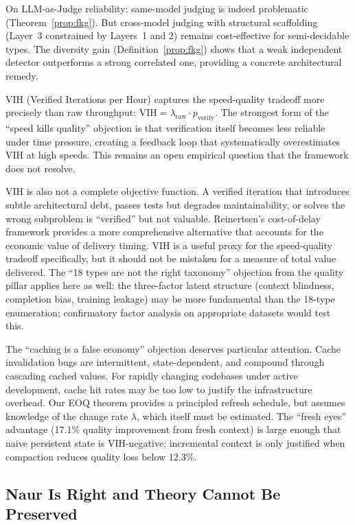 \documentclass[11pt, a4paper, logo, copyright]{googledeepmind}
\newcommand{\VIH}{\text{VIH}}
\begin{document}
On LLM-as-Judge reliability: same-model judging is indeed problematic (Theorem~\ref{prop:fkg}). But cross-model judging with structural scaffolding (Layer~3 constrained by Layers~1 and 2) remains cost-effective for semi-decidable types. The diversity gain (Definition~\ref{prop:fkg}) shows that a weak independent detector outperforms a strong correlated one, providing a concrete architectural remedy.

VIH (Verified Iterations per Hour) captures the speed-quality tradeoff more precisely than raw throughput: $\VIH = \lambda_{\mathrm{raw}} \cdot p_{\mathrm{verify}}$. The strongest form of the ``speed kills quality'' objection is that verification itself becomes less reliable under time pressure, creating a feedback loop that systematically overestimates VIH at high speeds. This remains an open empirical question that the framework does not resolve.

VIH is also not a complete objective function. A verified iteration that introduces subtle architectural debt, passes tests but degrades maintainability, or solves the wrong subproblem is ``verified'' but not valuable. Reinertsen's cost-of-delay framework provides a more comprehensive alternative that accounts for the economic value of delivery timing. VIH is a useful proxy for the speed-quality tradeoff specifically, but it should not be mistaken for a measure of total value delivered. The ``18 types are not the right taxonomy'' objection from the quality pillar applies here as well: the three-factor latent structure (context blindness, completion bias, training leakage) may be more fundamental than the 18-type enumeration; confirmatory factor analysis on appropriate datasets would test this.

The ``caching is a false economy'' objection deserves particular attention. Cache invalidation bugs are intermittent, state-dependent, and compound through cascading cached values. For rapidly changing codebases under active development, cache hit rates may be too low to justify the infrastructure overhead. Our EOQ theorem provides a principled refresh schedule, but assumes knowledge of the change rate $\lambda$, which itself must be estimated. The ``fresh eyes'' advantage (17.1\% quality improvement from fresh context) is large enough that naive persistent state is VIH-negative; incremental context is only justified when compaction reduces quality loss below 12.3\%.


\subsection{Naur Is Right and Theory Cannot Be Preserved}
\label{sec:contrarian-naur}
\end{document}
